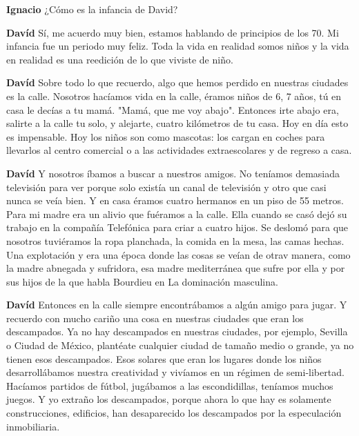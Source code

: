 \documentclass[
  spanish,
  11pt,
  a4paper,
]{scrbook}
\newenvironment{transcripcion}{
    \begin{list}{}{
        \setlength{\leftmargin}{1.5em}  %
        \setlength{\rightmargin}{0em}
        \setlength{\itemsep}{0.2em}     %
        \setlength{\parsep}{0.0em}
        \setlength{\listparindent}{0pt}
    }
}{
    \end{list}
}
\newcommand{\personaje}[1]{\textbf{#1}\quad}
\begin{document}
\begin{transcripcion}
\item \personaje{Ignacio} ¿Cómo es la infancia de David?

\item \personaje{Davíd} Sí, me acuerdo muy bien, estamos hablando de principios de los 70. Mi infancia fue un periodo muy feliz. Toda la vida en realidad somos niños y la vida en realidad es una reedición de lo que viviste de niño.

\item \personaje{Davíd} Sobre todo lo que recuerdo, algo que hemos perdido en nuestras ciudades es la calle. Nosotros hacíamos vida en la calle, éramos niños de 6, 7 años, tú en casa le decías a tu mamá. "Mamá, que me voy abajo". Entonces irte abajo era, salirte a la calle tu solo, y alejarte, cuatro kilómetros de tu casa. Hoy en día esto es impensable. Hoy los niños son como mascotas: los cargan en coches para llevarlos al centro comercial o a las actividades extraescolares y de regreso a casa.

\item \personaje{Davíd} Y nosotros íbamos a buscar a nuestros amigos. No teníamos demasiada televisión para ver porque solo existía un canal de televisión y otro que casi nunca se veía bien. Y en casa éramos cuatro hermanos en un piso de 55 metros. Para mi madre era un alivio que fuéramos a la calle. Ella cuando se casó dejó su trabajo en la compañía Telefónica para criar a cuatro hijos. Se deslomó para que nosotros tuviéramos la ropa planchada, la comida en la mesa, las camas hechas. Una explotación y era una época donde las cosas se veían de otrav manera, como la madre abnegada y sufridora, esa madre mediterránea que sufre por ella y por sus hijos de la que habla Bourdieu en La dominación masculina.

\item \personaje{Davíd} Entonces en la calle siempre encontrábamos a algún amigo para jugar. Y recuerdo con mucho cariño una cosa en nuestras ciudades que eran los descampados. Ya no hay descampados en nuestras ciudades, por ejemplo, Sevilla o Ciudad de México, plantéate cualquier ciudad de tamaño medio o grande, ya no tienen esos descampados. Esos solares que eran los lugares donde los niños desarrollábamos nuestra creatividad y vivíamos en un régimen de semi-libertad. Hacíamos partidos de fútbol, jugábamos a las escondidillas, teníamos muchos juegos. Y yo extraño los descampados, porque ahora lo que hay es solamente construcciones, edificios, han desaparecido los descampados por la especulación inmobiliaria.


\end{transcripcion}
\end{document}
